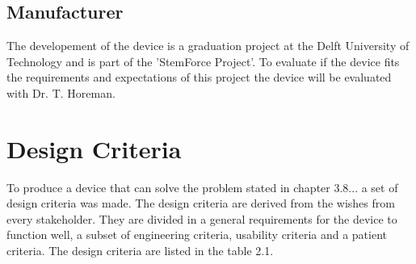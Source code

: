 \documentclass[whitelogo]{tudelft-report}
\begin{document}
{{\subsection{Manufacturer}
The developement of the device is a graduation project at the Delft University of Technology and is part of the 'StemForce Project'. To evaluate if the device fits the requirements and expectations of this project the device will be evaluated with Dr. T. Horeman. 
\\

\section{Design Criteria}
To produce a device that can solve the problem stated in chapter 3.8... a set of design criteria was made. The design criteria are derived from the wishes from every stakeholder. They are divided in a general requirements for the device to function well, a subset of engineering criteria, usability criteria and a patient criteria.
The design criteria are listed in the table 2.1.

}}
\end{document}
